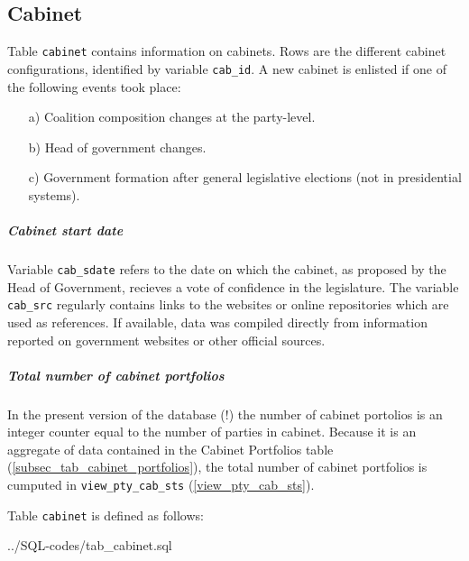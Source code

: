 \subsection{Cabinet}\label{subsec_tab_cabinet}
Table \texttt{\footnotesize cabinet} contains information on cabinets.
Rows are the different cabinet configurations, identified by variable \texttt{\footnotesize cab\_id}. 
A new cabinet is enlisted if one of the following events took place:
\begin{itemize}\label{cabinet_change_criteria}\itemsep-4pt 
\item[a)] Coalition composition changes at the party-level.
\item[b)] Head of government changes.
\item[c)] Government formation after general legislative elections (not in presidential systems).
\end{itemize}

\subparagraph{Cabinet start date} Variable \texttt{\footnotesize cab\_sdate} refers to the date on which the cabinet, as proposed by the Head of Government, recieves a vote of confidence in the legislature. The variable \texttt{\footnotesize cab\_src} regularly contains links to the websites or online repositories which are used as references. If available, data was compiled directly from information reported on government websites or other official sources.

\subparagraph{Total number of cabinet portfolios} In the present version of the database (!) the number of cabinet portolios is an integer counter equal to the number of parties in cabinet. 
Because it is an aggregate of data contained in the Cabinet Portfolios table (\ref{subsec_tab_cabinet_portfolios}), the total number of cabinet portfolios is cumputed in \texttt{\footnotesize view\_pty\_cab\_sts} (\ref{view_pty_cab_sts}).


Table \texttt{\footnotesize cabinet} is defined as follows:

%
{../SQL-codes/tab_cabinet.sql}

